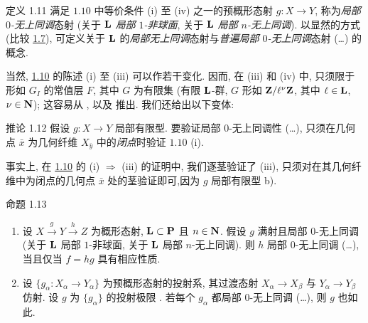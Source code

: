\begin{enonce*}{定义 1.11}
满足 $\hyperref[XV.prop1.10]{1.10}$ 中等价条件 {\rm(i)} 至 {\rm(iv)} 之一的预概形态射 $g:X\rightarrow Y$, 称为\emph{局部 $0$-无上同调}态射 (\resp 关于 $\mathbf{L}$ \emph{局部 $1$-非球面}, \resp 关于 $\mathbf{L}$ \emph{局部 $n$-无上同调}). 以显然的方式 (比较 \hyperref[XV.def1.7]{1.7}), 可定义关于 $\mathbf{L}$ 的\emph{局部无上同调}态射与\emph{普遍局部 $0$-无上同调}态射 (\resp\ldots) 的概念.
\end{enonce*}

当然, \hyperref[XV.prop1.10]{1.10} 的陈述 (i) 至 (iii) 可以作若干变化. 因而, 在 (iii) 和 (iv) 中, 只须限于形如 $G_{I}$ 的常值层 $F$,
其中 $G$ 为有限集 (\resp 有限 $\mathbf{L}$-群, \resp $G$ 形如 $\mathbf{Z}/\ell^{\nu}\mathbf{Z}$, 其中 $\ell\in\mathbf{L}$, $\nu\in \mathbf{N}$); 这容易从 ,  以及  推出. 我们还给出以下变体:

\begin{enonce*}{推论 1.12}
假设 $g:X\rightarrow Y$ 局部有限型. 要验证局部 $0$-无上同调性 (\resp\ldots), 只须在几何点 $\bar{x}$ 为几何纤维 $X_{\bar{y}}$ 中的\emph{闭点}时验证 $\hyperref[XV.prop1.10]{1.10}$ {\rm(i)}.
\end{enonce*}

事实上, 在 \hyperref[XV.prop1.10]{1.10} 的 (i) $\Rightarrow$ (iii) 的证明中, 我们逐茎验证了 (iii), 只须对在其几何纤维中为闭点的几何点 $\bar{x}$ 处的茎验证即可,\pageoriginale 因为 $g$ 局部有限型  b).

\begin{enonce*}{命题 1.13}
\begin{enumerate}
\renewcommand{\theenumi}{\roman{enumi}}
\renewcommand{\labelenumi}{(\theenumi)}
\item 设 $X\xrightarrow{g}Y\xrightarrow{h}Z$ 为概形态射, $\mathbf{L}\subset \mathbf{P}$ 且 $n\in \mathbf{N}$. 假设 $g$ 满射且局部 $0$-无上同调 (\resp 关于 $\mathbf{L}$ 局部 $1$-非球面, \resp 关于 $\mathbf{L}$ 局部 $n$-无上同调). 则 $h$ 局部 $0$-无上同调 (\resp\ldots), 当且仅当 $f=hg$ 具有相应性质.

\item 设 $\{g_{\alpha}:X_{\alpha}\rightarrow Y_{\alpha}\}$ 为预概形态射的投射系, 其过渡态射 $X_{\alpha}\rightarrow X_{\beta}$ 与 $Y_{\alpha}\rightarrow Y_{\beta}$ 仿射. 设 $g$ 为 $\{g_{\alpha}\}$ 的投射极限 . 若每个 $g_{\alpha}$ 都局部 $0$-无上同调 (\resp\ldots), 则 $g$ 也如此.
\end{enumerate}
\end{enonce*}

